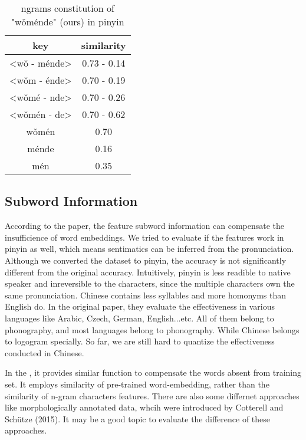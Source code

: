 \begin{table}[]
\centering
\caption{ngrams constitution of "wǒménde" (ours) in pinyin}
\label{table:ngrams-pinyin}
\begin{tabular}{|c|c|}
\hline
 key  &  similarity \\
\hline
<wǒ -  ménde>     &  0.73 - 0.14 \\
<wǒm -  énde>     &  0.70 - 0.19 \\
<wǒmé - nde>    &  0.70 - 0.26 \\
<wǒmén - de>     &  0.70 - 0.62\\
wǒmén      &  0.70 \\
  ménde     & 0.16   \\
mén     &  0.35   \\   
\hline
\end{tabular}
\end{table}

\subsection{Subword Information}

According to the paper, the feature subword information can compensate the insufficience of word embeddings. 
We tried to evaluate if the features work in pinyin as well, which means sentimatics can be inferred from the pronunciation. 
Although we converted the dataset to pinyin, the accuracy is not significantly different from the original accuracy. 
Intuitively, pinyin is less readible to native speaker and inreversible to the characters, since the multiple characters own the same pronunciation. 
Chinese contains less syllables and more homonyms than English do. In the original paper\cite{bojanowski2016enriching}, they evaluate the effectiveness in various languages like Arabic, Czech, German, English...etc.
All of them belong to phonography, and most languages belong to phonography. While Chinese belongs to logogram specially. 
So far, we are still hard to quantize the effectiveness conducted in Chinese.

In the \cite{DBLP:journals/corr/MikolovLS13}, it provides similar function to compensate the words absent from training set. 
It employs similarity of pre-trained word-embedding, rather than the similarity of n-gram characters features. 
There are also some differnet approaches like morphologically annotated data, whcih were introduced by Cotterell and Schütze (2015).
It may be a good topic to evaluate the difference of these approaches. 



